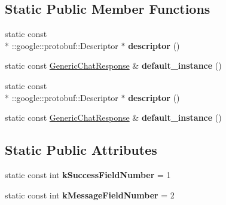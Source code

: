 \subsection*{Static Public Member Functions}
\begin{DoxyCompactItemize}
\item 
\hypertarget{classSimpleChat_1_1GenericChatResponse_a239ac446ce60ca453359b12bb5309e2a}{static const \\*
\-::google\-::protobuf\-::\-Descriptor $\ast$ {\bfseries descriptor} ()}\label{classSimpleChat_1_1GenericChatResponse_a239ac446ce60ca453359b12bb5309e2a}

\item 
\hypertarget{classSimpleChat_1_1GenericChatResponse_a05778077bddee03fd2e2feba394cb50c}{static const \hyperlink{classSimpleChat_1_1GenericChatResponse}{Generic\-Chat\-Response} \& {\bfseries default\-\_\-instance} ()}\label{classSimpleChat_1_1GenericChatResponse_a05778077bddee03fd2e2feba394cb50c}

\item 
\hypertarget{classSimpleChat_1_1GenericChatResponse_a239ac446ce60ca453359b12bb5309e2a}{static const \\*
\-::google\-::protobuf\-::\-Descriptor $\ast$ {\bfseries descriptor} ()}\label{classSimpleChat_1_1GenericChatResponse_a239ac446ce60ca453359b12bb5309e2a}

\item 
\hypertarget{classSimpleChat_1_1GenericChatResponse_a05778077bddee03fd2e2feba394cb50c}{static const \hyperlink{classSimpleChat_1_1GenericChatResponse}{Generic\-Chat\-Response} \& {\bfseries default\-\_\-instance} ()}\label{classSimpleChat_1_1GenericChatResponse_a05778077bddee03fd2e2feba394cb50c}

\end{DoxyCompactItemize}
\subsection*{Static Public Attributes}
\begin{DoxyCompactItemize}
\item 
\hypertarget{classSimpleChat_1_1GenericChatResponse_a473ca246e05ffceebe6b40435446443b}{static const int {\bfseries k\-Success\-Field\-Number} = 1}\label{classSimpleChat_1_1GenericChatResponse_a473ca246e05ffceebe6b40435446443b}

\item 
\hypertarget{classSimpleChat_1_1GenericChatResponse_a80c3f6d2ea5d4ac0958848671084fb1f}{static const int {\bfseries k\-Message\-Field\-Number} = 2}\label{classSimpleChat_1_1GenericChatResponse_a80c3f6d2ea5d4ac0958848671084fb1f}

\end{DoxyCompactItemize}
